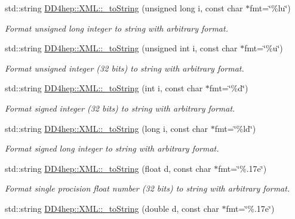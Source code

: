 \begin{DoxyCompactItemize}
std::string \hyperlink{group___d_d4_h_e_p___x_m_l_ga52447f7eb531c40682ba02c1271c1030}{DD4hep::XML::\_\-toString} (unsigned long i, const char $\ast$fmt=\char`\"{}\%lu\char`\"{})
\begin{DoxyCompactList}\small\item\em Format unsigned long integer to string with arbitrary format. \item\end{DoxyCompactList}\item 
std::string \hyperlink{group___d_d4_h_e_p___x_m_l_ga394251d8f037bcee0db303753aefc97b}{DD4hep::XML::\_\-toString} (unsigned int i, const char $\ast$fmt=\char`\"{}\%u\char`\"{})
\begin{DoxyCompactList}\small\item\em Format unsigned integer (32 bits) to string with arbitrary format. \item\end{DoxyCompactList}\item 
std::string \hyperlink{group___d_d4_h_e_p___x_m_l_ga3db5e3893d601405e4881f4e59aab45a}{DD4hep::XML::\_\-toString} (int i, const char $\ast$fmt=\char`\"{}\%d\char`\"{})
\begin{DoxyCompactList}\small\item\em Format signed integer (32 bits) to string with arbitrary format. \item\end{DoxyCompactList}\item 
std::string \hyperlink{group___d_d4_h_e_p___x_m_l_gab11cb9a1d8aa1ca280f2d88345983838}{DD4hep::XML::\_\-toString} (long i, const char $\ast$fmt=\char`\"{}\%ld\char`\"{})
\begin{DoxyCompactList}\small\item\em Format signed long integer to string with arbitrary format. \item\end{DoxyCompactList}\item 
std::string \hyperlink{group___d_d4_h_e_p___x_m_l_ga5fe476c5280899829d9defb4386524a9}{DD4hep::XML::\_\-toString} (float d, const char $\ast$fmt=\char`\"{}\%.17e\char`\"{})
\begin{DoxyCompactList}\small\item\em Format single procision float number (32 bits) to string with arbitrary format. \item\end{DoxyCompactList}\item 
std::string \hyperlink{group___d_d4_h_e_p___x_m_l_ga101954caf40eafb6b0bc58223764a3d4}{DD4hep::XML::\_\-toString} (double d, const char $\ast$fmt=\char`\"{}\%.17e\char`\"{})

\end{DoxyCompactItemize}

